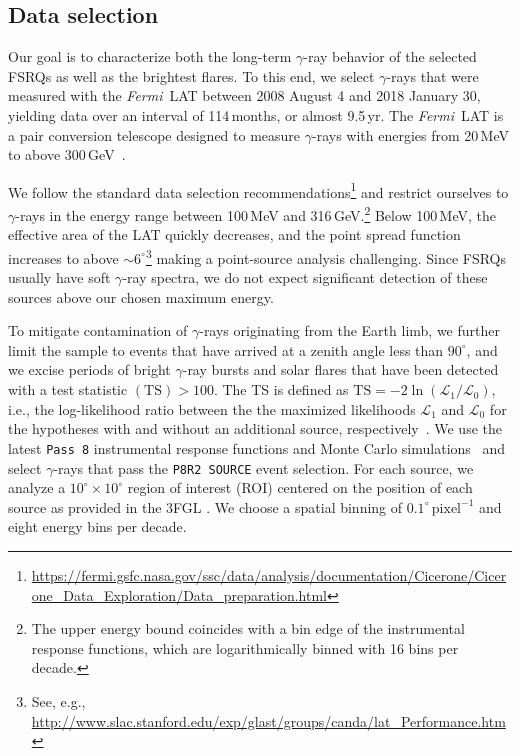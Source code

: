 \documentclass[twocolumn]{aastex62}
\newcommand{\Grays}{$\gamma$-rays\xspace}
\newcommand{\gray}{$\gamma$-ray\xspace}
\newcommand{\FermiLAT}{\emph{Fermi}~LAT\xspace}
\begin{document}
\subsection{Data selection}

Our goal is to characterize both the long-term \gray behavior of the selected FSRQs as well as the brightest flares.
To this end, we select \Grays that were measured with the \FermiLAT between 2008 August 4 and 2018 January 30, yielding data over an interval of 114\,months, or almost 9.5\,yr.
The \FermiLAT is a pair conversion telescope designed to measure \Grays with energies from 20\,MeV to above 300\,GeV~\citep{2009ApJ...697.1071A}.

We follow the standard data selection recommendations\footnote{\url{https://fermi.gsfc.nasa.gov/ssc/data/analysis/documentation/Cicerone/Cicerone_Data_Exploration/Data_preparation.html}} and  restrict ourselves to \Grays in the energy range between 100\,MeV and 316\,GeV.\footnote{The upper energy bound  coincides with a bin edge of the instrumental response functions, which are logarithmically binned with 16 bins per decade.}
Below 100\,MeV, the effective area of the LAT quickly decreases, and the point spread function increases to above $\sim 6^\circ$\footnote{See, e.g., \url{http://www.slac.stanford.edu/exp/glast/groups/canda/lat_Performance.htm}} making a point-source analysis challenging. 
Since FSRQs usually have soft \gray spectra, we do not expect significant detection of these sources above our chosen maximum energy.

To mitigate contamination of \Grays originating from the Earth limb, we further limit the sample to events that have arrived at a zenith angle less than $90^\circ$, and we excise periods of bright \gray bursts and solar flares that have been detected with a test statistic $(\mathrm{TS}) > 100$.
The TS is defined as $\mathrm{TS} = -2\ln(\mathcal{L}_1 / \mathcal{L}_0)$, i.e., the log-likelihood ratio between the the maximized likelihoods $\mathcal{L}_1$ and $\mathcal{L}_0$ for the hypotheses with and without an additional source, respectively~\citep{mattox1996}.
We use the latest \texttt{Pass 8} instrumental response functions and Monte Carlo simulations~\citep{pass8} and select \Grays that pass the \texttt{P8R2 SOURCE} event selection. 
For each source, we analyze a $10^\circ \times 10^\circ$ region of interest (ROI) centered on the position of each source as provided in the 3FGL \citep[3FGL,][]{3fgl}.
We choose a spatial binning of $0.1^\circ\,\mathrm{pixel}^{-1}$ and eight energy bins per decade. 
\end{document}

